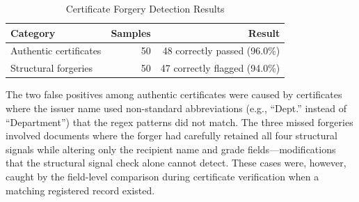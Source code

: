 {\begin{table}[htbp]
\centering
\caption{Certificate Forgery Detection Results}
\label{tab:forgery}
\begin{tabular}{l r r}
\hline
\textbf{Category} & \textbf{Samples} & \textbf{Result} \\
\hline
Authentic certificates & 50 & 48 correctly passed (96.0\%) \\
Structural forgeries & 50 & 47 correctly flagged (94.0\%) \\
\hline
\end{tabular}
\end{table}

The two false positives among authentic certificates were caused by certificates where the issuer name used non-standard abbreviations (e.g., ``Dept.'' instead of ``Department'') that the regex patterns did not match. The three missed forgeries involved documents where the forger had carefully retained all four structural signals while altering only the recipient name and grade fields---modifications that the structural signal check alone cannot detect. These cases were, however, caught by the field-level comparison during certificate verification when a matching registered record existed.
}

